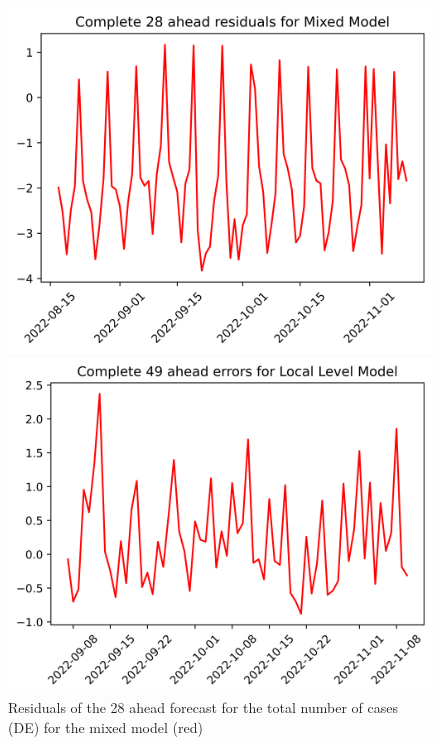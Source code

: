 \begin{figure}

\begin{minipage}{.32\textwidth}
  \centering
  \includegraphics[width=\linewidth]{pics/28_ah/DE_28_ahead_errors_Mixed Model.png}
  \caption{Residuals of the 28 ahead forecast for the total number of cases (DE) for the mixed model (red)}
  \label{fig:tot_cases_error_28_mix_DE}
\end{minipage}
\begin{minipage}{.32\textwidth}
  \centering
  \includegraphics[width=\linewidth]{pics/49_ah/49_ahead_errors_Local Level Model.png}

\end{minipage}
\end{figure}
